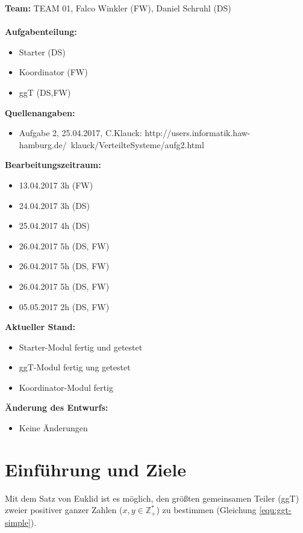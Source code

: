 \documentclass{article}
\begin{document}
\textbf{Team:} TEAM 01, Falco Winkler (FW), Daniel Schruhl (DS)\\
\\
\textbf{Aufgabenteilung:}
\begin{itemize}
    \item Starter (DS)
    \item Koordinator (FW)
    \item ggT (DS,FW)
\end{itemize}

\textbf{Quellenangaben:}
\begin{itemize}
    \item Aufgabe 2, 25.04.2017, C.Klauck: \newline
    http://users.informatik.haw-hamburg.de/~klauck/VerteilteSysteme/aufg2.html
\end{itemize}

\textbf{Bearbeitungszeitraum:}
\begin{itemize}
	\item 13.04.2017 3h (FW)
	\item 24.04.2017 3h (DS)
	\item 25.04.2017 4h (DS)
	\item 26.04.2017 5h (DS, FW)
	\item 26.04.2017 5h (DS, FW)
	\item 26.04.2017 5h (DS, FW)
	\item 05.05.2017 2h (DS, FW)
\end{itemize}

\textbf{Aktueller Stand:}
\begin{itemize}
	\item Starter-Modul fertig und getestet
	\item ggT-Modul fertig ung getestet
	\item Koordinator-Modul fertig
\end{itemize}

\textbf{Änderung des Entwurfs:}
\begin{itemize}
    \item Keine Änderungen
\end{itemize}

\newpage

\section{Einführung und Ziele}
Mit dem Satz von Euklid ist es möglich, den größten gemeinsamen Teiler (ggT) zweier positiver ganzer Zahlen
($x,y \in \mathbb{Z}^{*}_{+}$) zu bestimmen (Gleichung \ref{equ:ggt-simple}).
\end{document}
